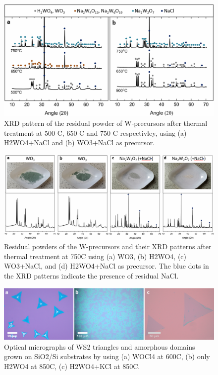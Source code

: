 \documentclass[12pt]{article}
\begin{document}
\begin{figure}[h]
\begin{center}
\includegraphics[scale=0.3]{PaperSIXRD.png}
\caption{XRD pattern of the residual powder of W-precursors after thermal treatment at 500 {\degree}C, 650 {\degree}C and 750 {\degree}C respectivley, using (a) H2WO4+NaCl and (b) WO3+NaCl as precursor.}
\label{fig:PaperSIXRD}
\end{center}
\end{figure}

\begin{figure}[h]
\begin{center}
\includegraphics[scale=0.3]{PaperSIXRDOptical.png}
\caption{Residual powders of the W-precursors and their XRD patterns after thermal treatment at 750{\degree}C using (a) WO3, (b) H2WO4, (c) WO3+NaCl, and (d) H2WO4+NaCl as precursor. The blue dots in the XRD patterns indicate the presence of residual NaCl.}
\label{fig:PaperSIXRDOptical}
\end{center}
\end{figure}

\begin{figure}[h]
\begin{center}
\includegraphics[scale=0.3]{PaperSIOpticalPrecursors.png}
\caption{Optical micrographs of WS2 triangles and amorphous domains grown on SiO2/Si substrates by using (a) WOCl4 at 600{\degree}C, (b) only H2WO4 at 850{\degree}C, (c) H2WO4+KCl at 850{\degree}C.}
\label{fig:PaperSIOpticalPrecursors}
\end{center}
\end{figure}
\end{document}
